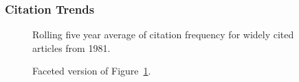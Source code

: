 \documentclass[
  10pt,
  letterpaper,
  DIV=11,
  numbers=noendperiod,
  twoside]{scrartcl}
\begin{document}
\subsubsection*{Citation Trends}\label{citation-trends-5}

\begin{figure}


\caption{\label{fig-citation-spaghetti-1981}Rolling five year average of
citation frequency for widely cited articles from 1981.}

\end{figure}%

\begin{figure}


\caption{\label{fig-citation-facet-1981}Faceted version of
Figure~\ref{fig-citation-spaghetti-1981}.}

\end{figure}%
\end{document}

